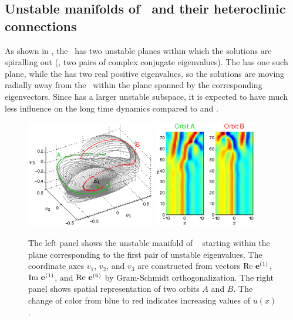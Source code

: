 \subsection{Unstable manifolds of \eqva\ and their heteroclinic
            connections}
\label{sec:unstMnflds}

As shown in ,
the  \eqv\ has two unstable
planes within which the solutions are spiralling out (\ie, two
pairs of complex conjugate eigenvalues).  The  has one such plane,
while the  has two real positive eigenvalues, so the solutions are
moving radially away from the \eqv\ within the plane spanned
by the corresponding eigenvectors.  Since  has
a larger unstable subspace, it is expected to have much less influence on the
long time dynamics compared to  and .

\begin{figure}[t]
\begin{center}
\includegraphics[width=0.5\textwidth, clip=true]{figs_bmp/ks22_E1_plane1_manifold_c.eps}
\includegraphics[width=0.4\textwidth, clip=true]{figs_bmp/ks22_E1_plane1_orbits_c.eps}
\end{center}
\caption{
The left panel shows the unstable
manifold of \eqv\  starting within the plane
corresponding to the first pair of unstable eigenvalues. The
coordinate axes $v_1$, $v_2$, and $v_3$ are constructed from vectors
${\rm Re\,} \,{\mathbf e}^{(1)}$, ${\rm Im\,} \,{\mathbf e}^{(1)}$,
and ${\rm Re\,} \,{\mathbf e}^{(6)}$
by Gram-Schmidt orthogonalization.
The right panel shows spatial representation of two orbits $A$ and $B$.
The change of color from blue to red indicates increasing values of
$u(x)$.
}
\label{f:KS22E1man1}
\end{figure}

